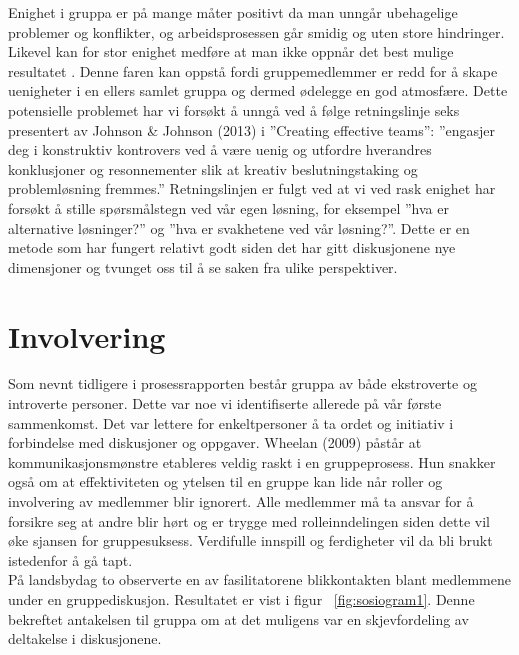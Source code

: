 Enighet i gruppa er på mange måter positivt da man unngår ubehagelige problemer og konflikter, og arbeidsprosessen går smidig og uten store hindringer. Likevel kan for stor enighet medføre at man ikke oppnår det best mulige resultatet \cite{effectiveTeams}. Denne faren kan oppstå fordi gruppemedlemmer er redd for å skape uenigheter i en ellers samlet gruppa og dermed ødelegge en god atmosfære. Dette potensielle problemet har vi forsøkt å unngå ved å følge retningslinje seks presentert av Johnson & Johnson (2013)\cite{gruppeteori} i ''Creating effective teams'': ''engasjer deg i konstruktiv kontrovers ved å være uenig og utfordre hverandres konklusjoner og resonnementer slik at kreativ beslutningstaking og problemløsning fremmes.'' Retningslinjen er fulgt ved at vi ved rask enighet har forsøkt å stille spørsmålstegn ved vår egen løsning, for eksempel ''hva er alternative løsninger?'' og ''hva er svakhetene ved vår løsning?''. Dette er en metode som har fungert relativt godt siden det har gitt diskusjonene nye dimensjoner og tvunget oss til å se saken fra ulike perspektiver.\\

\section{Involvering}

Som nevnt tidligere i prosessrapporten består gruppa av både ekstroverte og introverte personer. Dette var noe vi identifiserte allerede på vår første sammenkomst. Det var lettere for enkeltpersoner å ta ordet og initiativ i forbindelse med diskusjoner og oppgaver. Wheelan (2009)\cite{effectiveTeams} påstår at kommunikasjonsmønstre etableres veldig raskt i en gruppeprosess. Hun snakker også om at effektiviteten og ytelsen til en gruppe kan lide når roller og involvering av medlemmer blir ignorert. Alle medlemmer må ta ansvar for å forsikre seg at andre blir hørt og er trygge med rolleinndelingen siden dette vil øke sjansen for gruppesuksess. Verdifulle innspill og ferdigheter vil da bli brukt istedenfor å gå tapt.\\

På landsbydag to observerte en av fasilitatorene blikkontakten blant medlemmene under en gruppediskusjon. Resultatet er vist i figur ~\ref{fig:sosiogram1}. Denne bekreftet antakelsen til gruppa om at det muligens var en skjevfordeling av deltakelse i diskusjonene.\\

